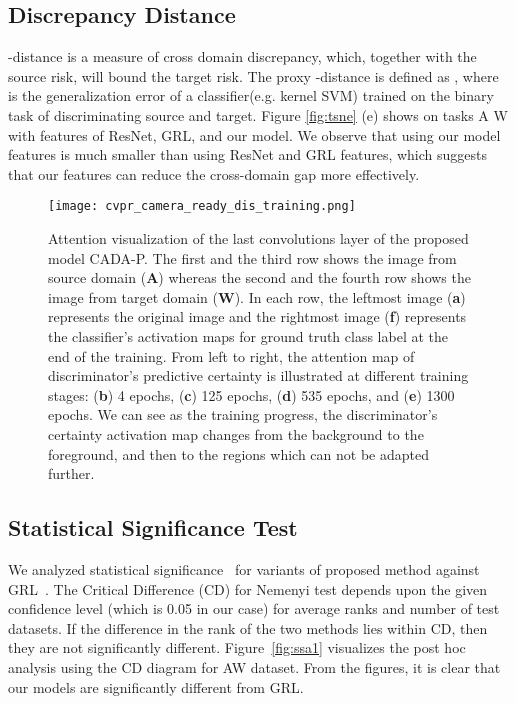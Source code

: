 \documentclass[10pt,twocolumn,letterpaper]{article}
\begin{document}
\subsection{Discrepancy Distance}
\vspace{-0.4em}
 -distance is a measure of cross domain discrepancy\cite{ben_ML2010}, which, together with the source risk, will bound the target risk. The proxy -distance is defined as , where  is the generalization error of a classifier(e.g. kernel SVM) trained on the binary task of discriminating source and target. Figure \ref{fig:tsne} (e) shows  on tasks
A W with features of ResNet\cite{he2016deep}, GRL\cite{ganin_ICML2015}, and our model. We observe that  using our model features is much smaller than   using ResNet and GRL features, which suggests that our features can reduce the cross-domain gap more effectively. 
\begin{figure}[!ht]
     \centering
      \texttt{[image: cvpr\_camera\_ready\_dis\_training.png]}
      \caption{Attention visualization of the last convolutions layer of the proposed model CADA-P. The first and the third row shows the image from source domain (\textbf{A}) whereas the second and the fourth row shows the image from target domain  (\textbf{W}). In each row, the leftmost image (\textbf{a}) represents the original image and the rightmost image (\textbf{f}) represents the classifier's activation maps for ground truth class label at the end of the training. From left to right, the attention map of discriminator's predictive certainty is illustrated at different training stages: (\textbf{b}) 4 epochs, (\textbf{c}) 125 epochs, (\textbf{d}) 535 epochs, and (\textbf{e}) 1300 epochs. We can see as the training progress, the discriminator's certainty activation map changes from the background to the foreground, and then to the regions which can not be adapted further.}
      \label{fig:dis_train}
      \vspace{-0.6em}
 \end{figure}
\subsection{Statistical Significance Test}
\vspace{-0.4em}
We analyzed statistical significance~\cite{demvsar_JMLR2006} for variants of proposed method against GRL~\cite{ganin_ICML2015}. The Critical Difference (CD) for Nemenyi test depends upon the given confidence level (which is 0.05 in our case) for average ranks and number of test datasets. If the difference in the rank of the two methods lies within CD, then they are not significantly different. Figure~\ref{fig:ssa1} visualizes the post hoc analysis using the CD diagram for AW dataset. From the figures, it is clear that our models are significantly different from GRL\cite{ganin_ICML2015}.
\end{document}
